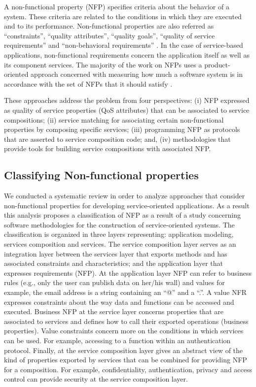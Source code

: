 A non-functional property (NFP) specifies criteria about the behavior of a system. These criteria are related to the conditions in which they are executed and to its performance. Non-functional properties are also referred as “constraints”, “quality attributes”, “quality goals”, “quality of service requirements” and “non-behavioral requirements” \cite{StGr05}. In the case of service-based applications, non-functional requirements concern the application itself as well as its component services. 
The majority of the work on NFPs uses a product-oriented approach concerned with measuring how much a software system is in accordance with the set of NFPs that it should satisfy \cite{BBKL78,FePf96,KiDa96,Lyu96,MuIO90}. 


These  approaches address the problem from four perspectives: (i) NFP expressed as quality of service properties (QoS attributes) that can be associated to service compositions; (ii) service matching for associating certain non-functional properties by composing specific services;  (iii) programming NFP as protocols that are asserted to service composition code; and, (iv) methodologies that provide tools for building service compositions with associated NFP. 

\subsection{Classifying Non-functional properties}
We conducted a systematic review \cite{placidoPhDThesis2012} in order to analyze approaches that consider non-functional properties for developing service-oriented applications. As a result this analysis proposes a classification of NFP as a result of a study concerning software methodologies for the construction of service-oriented systems. The classification is organized in three layers representing: application modeling, services composition and services. The service composition layer serves as an integration layer between the services layer that exports methods and has associated constraints and characteristics; and the application layer that expresses requirements (NFP). At the application layer NFP can refer to business rules (e.g., only the user can publish data on her/his wall) and values for example, the email address is a string containing an “@” and a “.”. A value NFR expresses constraints about the way data and functions can be accessed and executed. 
Business NFP at the service layer concerns properties that are associated to services and defines how to call their exported operations (business properties).  Value constraints concern more on the conditions in which services can be used. For example, accessing to a function within an authentication protocol.
Finally, at the service composition layer gives an abstract view of the kind of properties exported by services that can be combined for providing NFP for a composition.  For example, confidentiality, authentication, privacy and access control can provide security at the service composition layer. 


